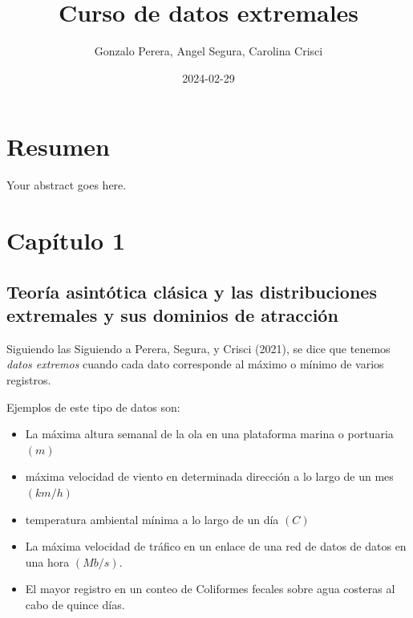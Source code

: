 \documentclass[
  oneside]{book}
\title{Curso de datos extremales}
\author{Gonzalo Perera, Angel Segura, Carolina Crisci}
\date{2024-02-29}
\begin{document}
\frontmatter
\maketitle

\mainmatter
\newpage

\thispagestyle{empty}

\maketitle

\newpage

\tableofcontents

\newpage

\hypertarget{resumen}{%
\chapter{Resumen}\label{resumen}}

Your abstract goes here.

\chapter{Capítulo 1}
\section{Teoría asintótica clásica y las distribuciones extremales y sus dominios de atracción}

Siguiendo las Siguiendo a Perera, Segura, y Crisci (2021), se dice que
tenemos \textit{datos extremos} cuando cada dato corresponde al máximo o
mínimo de varios registros.

Ejemplos de este tipo de datos son:

\begin{itemize}
\item La máxima altura semanal de la ola en una plataforma marina o portuaria $(m)$
\item máxima velocidad de viento en determinada dirección a lo largo de un mes $(km/h)$
\item temperatura ambiental mínima a lo largo de un día $(C)$
\item La máxima velocidad de tráfico en un enlace de una red de datos de datos en una hora $(Mb/s)$.
\item El mayor registro en un conteo de Coliformes fecales sobre agua costeras al cabo de quince días.
\end{itemize}
\end{document}
